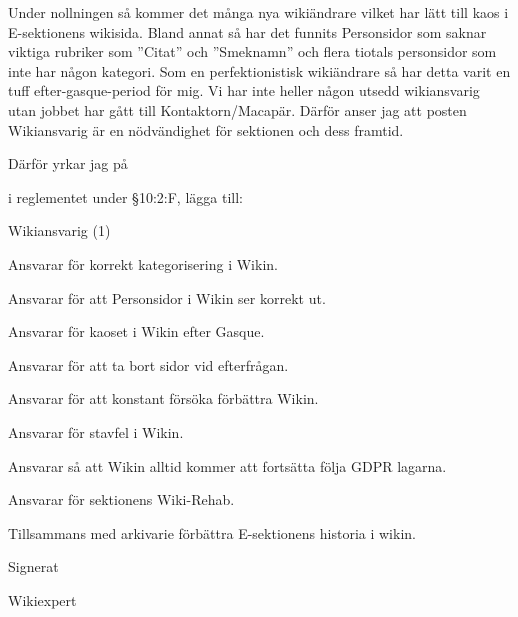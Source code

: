 \documentclass[../_main/handlingar.tex]{subfiles}
\begin{document}
Under nollningen så kommer det många nya wikiändrare vilket har lätt till kaos i E-sektionens
wikisida. Bland annat så har det funnits Personsidor som saknar viktiga rubriker som ”Citat” och
”Smeknamn” och flera tiotals personsidor som inte har någon kategori. Som en perfektionistisk
wikiändrare så har detta varit en tuff efter-gasque-period för mig. Vi har inte heller någon utsedd
wikiansvarig utan jobbet har gått till Kontaktorn/Macapär. Därför anser jag att posten Wikiansvarig
är en nödvändighet för sektionen och dess framtid.

Därför yrkar jag på

\begin{attsatser}
\att i reglementet under \S10:2:F, lägga till:\par
\begin{emptylist}
    \item Wikiansvarig (1)
      \begin{dashlist}
        \item Ansvarar för korrekt kategorisering i Wikin.
        \item Ansvarar för att Personsidor i Wikin ser korrekt ut.
        \item Ansvarar för kaoset i Wikin efter Gasque.
        \item Ansvarar för att ta bort sidor vid efterfrågan.
        \item Ansvarar för att konstant försöka förbättra Wikin.
        \item Ansvarar för stavfel i Wikin.
        \item Ansvarar så att Wikin alltid kommer att fortsätta följa GDPR lagarna.
        \item Ansvarar för sektionens Wiki-Rehab.
        \item Tillsammans med arkivarie förbättra E-sektionens historia i wikin.
      \end{dashlist}
    \end{emptylist}
\end{attsatser}
\begin{signatures}{1}
    Signerat
    \signature{Anonym}{Wikiexpert}
\end{signatures}
\end{document}
